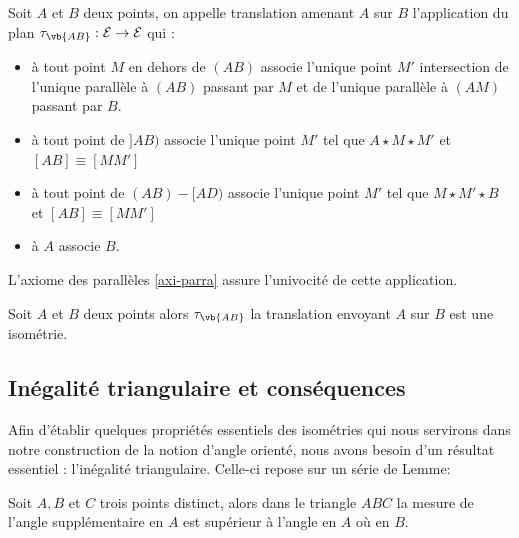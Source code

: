 \begin{defi}[Translation]
    Soit $A$ et $B$ deux points, on appelle translation amenant $A$ sur $B$ l'application du plan $\tau_{\vb{AB}} : \mathcal{E} \to \mathcal{E}$ qui :
    \begin{itemize}[$\bullet$]
        \item à tout point $M$ en dehors de $(AB)$ associe l'unique point $M'$ intersection de l'unique parallèle à $(AB)$ passant par $M$ et de l'unique parallèle à $(AM)$ passant par $B$. 
        \item à tout point de $]AB)$ associe l'unique point $M'$ tel que $A\star M \star M'$ et $[AB]\equiv [MM']$
        \item à tout point de $(AB)-[AD)$ associe l'unique point $M'$ tel que $M\star M' \star B$ et $[AB]\equiv [MM']$
        \item à $A$ associe $B$.
    \end{itemize}
\end{defi}  
\begin{rema}
    L'axiome des parallèles \ref{axi-parra} assure l'univocité de cette application.
\end{rema}
\begin{thm}
    Soit $A$ et $B$ deux points alors $\tau_{\vb{AB}}$ la translation envoyant $A$ sur $B$ est une isométrie. 
\end{thm}

        \subsection{Inégalité triangulaire et conséquences}

Afin d'établir quelques propriétés essentiels des isométries qui nous servirons dans notre construction de la notion d'angle orienté, nous avons besoin d'un résultat essentiel : l'inégalité triangulaire. Celle-ci repose sur un série de Lemme:


\begin{thm}
    Soit $A,B$ et $C$ trois points distinct, alors dans le triangle $ABC$ la mesure de l'angle supplémentaire en $A$ est supérieur à l'angle en $A$ où en $B$.
\end{thm}

